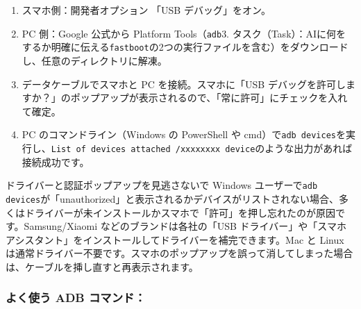 \begin{enumerate}
  \item スマホ側：開発者オプション 「USB デバッグ」をオン。
  \item PC 側：Google 公式から Platform Tools（\texttt{adb}3. タスク（Task）：AIに何をするか明確に伝える\texttt{fastboot}の2つの実行ファイルを含む）をダウンロードし、任意のディレクトリに解凍。
  \item データケーブルでスマホと PC を接続。スマホに「USB デバッグを許可しますか？」のポップアップが表示されるので、「常に許可」にチェックを入れて確定。
  \item PC のコマンドライン（Windows の PowerShell や cmd）で\texttt{adb devices}を実行し、\texttt{List of devices attached /\allowbreak  xxxxxxxx device}のような出力があれば接続成功です。
\end{enumerate}

\begin{tcbwarn}{ドライバーと認証ポップアップを見逃さないで}
Windows ユーザーで\texttt{adb devices}が「unauthorized」と表示されるかデバイスがリストされない場合、多くはドライバーが未インストールかスマホで「許可」を押し忘れたのが原因です。Samsung/Xiaomi などのブランドは各社の「USB ドライバー」や「スマホアシスタント」をインストールしてドライバーを補完できます。Mac と Linux は通常ドライバー不要です。スマホのポップアップを誤って消してしまった場合は、ケーブルを挿し直すと再表示されます。

\end{tcbwarn}

\subsubsection*{よく使う ADB コマンド：}

